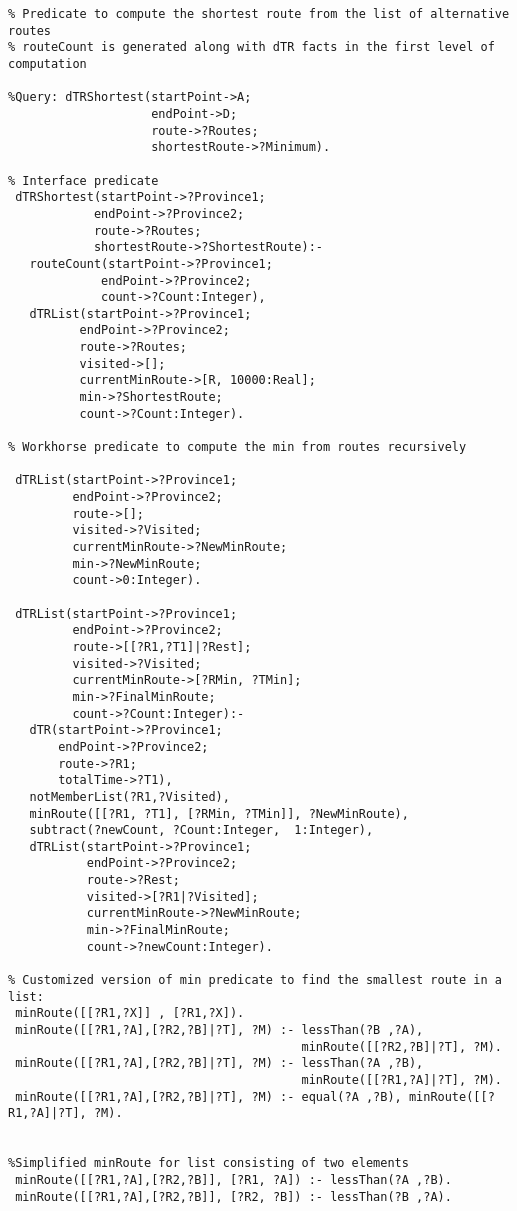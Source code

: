 \footnotesize
\begin{verbatim}
% Predicate to compute the shortest route from the list of alternative routes
% routeCount is generated along with dTR facts in the first level of computation
 
%Query: dTRShortest(startPoint->A;  
                    endPoint->D; 
                    route->?Routes;  
                    shortestRoute->?Minimum).

% Interface predicate
 dTRShortest(startPoint->?Province1;  
            endPoint->?Province2; 
            route->?Routes; 
            shortestRoute->?ShortestRoute):-
   routeCount(startPoint->?Province1; 
             endPoint->?Province2;  
             count->?Count:Integer),
   dTRList(startPoint->?Province1;  
          endPoint->?Province2;  
          route->?Routes;  
          visited->[];   
          currentMinRoute->[R, 10000:Real];  
          min->?ShortestRoute; 
          count->?Count:Integer).

% Workhorse predicate to compute the min from routes recursively

 dTRList(startPoint->?Province1;  
         endPoint->?Province2;  
         route->[];  
         visited->?Visited;   
         currentMinRoute->?NewMinRoute;  
         min->?NewMinRoute; 
         count->0:Integer).
 
 dTRList(startPoint->?Province1;  
         endPoint->?Province2;  
         route->[[?R1,?T1]|?Rest];  
         visited->?Visited;   
         currentMinRoute->[?RMin, ?TMin];  
         min->?FinalMinRoute; 
         count->?Count:Integer):-
   dTR(startPoint->?Province1; 
       endPoint->?Province2; 
       route->?R1; 
       totalTime->?T1),
   notMemberList(?R1,?Visited),
   minRoute([[?R1, ?T1], [?RMin, ?TMin]], ?NewMinRoute),
   subtract(?newCount, ?Count:Integer,  1:Integer),
   dTRList(startPoint->?Province1;  
           endPoint->?Province2;  
           route->?Rest; 
           visited->[?R1|?Visited];   
           currentMinRoute->?NewMinRoute; 
           min->?FinalMinRoute; 
           count->?newCount:Integer). 
  
% Customized version of min predicate to find the smallest route in a list:
 minRoute([[?R1,?X]] , [?R1,?X]).
 minRoute([[?R1,?A],[?R2,?B]|?T], ?M) :- lessThan(?B ,?A), 
                                         minRoute([[?R2,?B]|?T], ?M).
 minRoute([[?R1,?A],[?R2,?B]|?T], ?M) :- lessThan(?A ,?B), 
                                         minRoute([[?R1,?A]|?T], ?M).
 minRoute([[?R1,?A],[?R2,?B]|?T], ?M) :- equal(?A ,?B), minRoute([[?R1,?A]|?T], ?M).                                         


%Simplified minRoute for list consisting of two elements
 minRoute([[?R1,?A],[?R2,?B]], [?R1, ?A]) :- lessThan(?A ,?B).
 minRoute([[?R1,?A],[?R2,?B]], [?R2, ?B]) :- lessThan(?B ,?A).
\end{verbatim}

